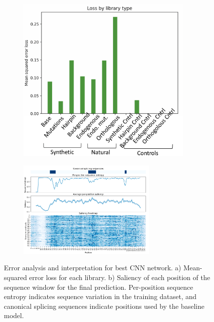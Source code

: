 \documentclass{article}
\begin{document}
\begin{figure}[H]
\centering
\begin{subfigure}{0.3\textwidth}
\centering
\includegraphics[width=0.95\textwidth]{../figures/library_type.png} \caption{} 
\label{fig:library}
\end{subfigure}%
\begin{subfigure}{0.7\textwidth}
\centering
 \includegraphics[width=0.75\textwidth]{../figures/saliency.png} \caption{} 
\label{fig:saliency}
\end{subfigure}
\caption{Error analysis and interpretation for best CNN network. a) Mean-squared error loss for each library. b) Saliency of each position of the sequence window for the final prediction. Per-position sequence entropy indicates sequence variation in the training dataset, and canonical splicing sequences indicate positions used by the baseline model.}
\end{figure}
\end{document}
